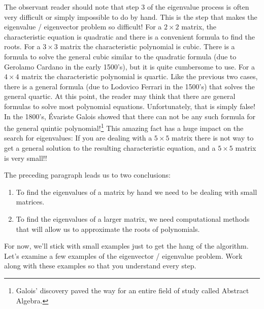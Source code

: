 The observant reader should note that step 3 of the eigenvalue process is often very
difficult or simply impossible to do by hand.  This is the step that makes the eigenvalue
/ eigenvector problem so difficult! For a $2 \times 2$ matrix, the characteristic equation
is quadratic and there is a convenient formula to find the roots.  For a $3 \times 3$
matrix the characteristic polynomial is cubic.  There is a formula to solve the general
cubic similar to the quadratic formula (due to Gerolamo Cardano in the early 1500's), but
it is quite cumbersome to use.  For a $4 \times 4$ matrix the characteristic polynomial is
quartic.  Like the previous two cases, there is a general formula (due to Lodovico Ferrari
in the 1500's) that solves the general quartic.  At this point, the reader may think that
there are general formulas to solve most polynomial equations.  Unfortunately, that is
simply false!  In the 1800's, \'Evariste Galois showed that there can not be any such
formula for the general quintic polynomial!\footnote{Galois' discovery paved the way for
an entire field of study called Abstract Algebra.}  This amazing fact has a huge impact on the
search for eigenvalues: If you are dealing with a $5\times 5$ matrix there is not way to
get a general solution to the resulting characteristic equation, and a $5 \times 5$ matrix
is very small!!

The preceding paragraph leads us to two conclusions:
\begin{enumerate}
    \item To find the eigenvalues of a matrix by hand we need to be dealing with small
        matrices.
    \item To find the eigenvalues of a larger matrix, we need computational methods that
        will allow us to approximate the roots of polynomials.  
\end{enumerate}
For now, we'll stick with small examples just to get the hang of the algorithm.  Let's
examine a few examples of the eigenvector / eigenvalue problem.  Work along with these
examples so that you understand every step.

